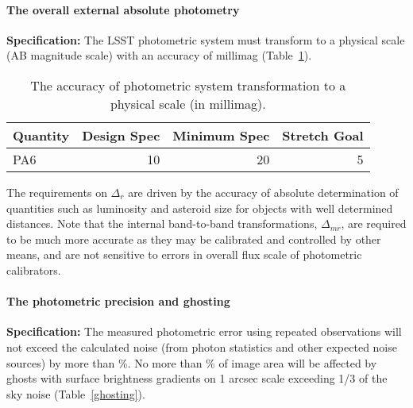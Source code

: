 \paragraph{The overall external absolute photometry\\}

{\bf Specification:} The LSST photometric system must transform to a
physical scale (\eg AB magnitude scale) with an accuracy of
millimag (Table~\ref{ToffsetsAB}).

\begin{table}[h]
\begin{tabular}{|l|r|r|r|}
\hline
Quantity   & Design Spec  & Minimum Spec & Stretch Goal   \\
\hline
     PA6  &     10       &       20     &       5         \\
\hline
\end{tabular}
\caption{The accuracy of photometric system transformation to a physical scale
(in millimag). }
\label{ToffsetsAB}
\end{table}

The requirements on $\Delta_{r}$ are driven by the accuracy of absolute determination of
quantities such as luminosity and asteroid size for objects with well
determined distances. Note that the internal band-to-band transformations,
$\Delta_{mr}$, are required to be much more accurate as they may be calibrated
and controlled by other means, and are not sensitive to errors in overall
flux scale of photometric calibrators.



\paragraph{The photometric precision and ghosting\\}

{\bf Specification:} The measured photometric error using repeated observations
will not exceed the calculated noise (from photon statistics and other
expected noise sources) by more than
\%. No more than
\% of image area will be affected by ghosts with surface brightness gradients
on 1 arcsec scale exceeding 1/3 of the sky noise (Table~\ref{ghosting}).


